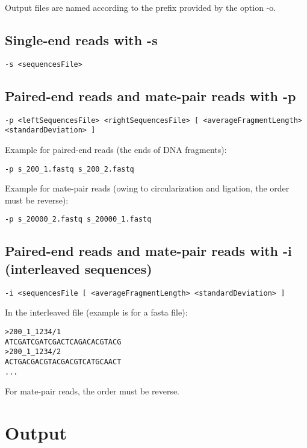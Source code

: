 \documentclass{article}
\begin{document}
Output files are named according to the prefix provided by the option -o.

\subsection{Single-end reads with -s}

\begin{verbatim}
-s <sequencesFile>
\end{verbatim}

\subsection{Paired-end reads and mate-pair reads with -p}

\begin{verbatim}
-p <leftSequencesFile> <rightSequencesFile> [ <averageFragmentLength> <standardDeviation> ]
\end{verbatim}

Example for paired-end reads (the ends of DNA fragments):

\begin{verbatim}
-p s_200_1.fastq s_200_2.fastq
\end{verbatim}

Example for mate-pair reads (owing to circularization and ligation, the order must be reverse):

\begin{verbatim}
-p s_20000_2.fastq s_20000_1.fastq
\end{verbatim}

\subsection{Paired-end reads and mate-pair reads with -i (interleaved sequences)}

\begin{verbatim}
-i <sequencesFile [ <averageFragmentLength> <standardDeviation> ]
\end{verbatim}

In the interleaved file (example is for a fasta file):

\begin{verbatim}
>200_1_1234/1
ATCGATCGATCGACTCAGACACGTACG
>200_1_1234/2
ACTGACGACGTACGACGTCATGCAACT
...
\end{verbatim}

For mate-pair reads, the order must be reverse.


\section{Output}
\end{document}
